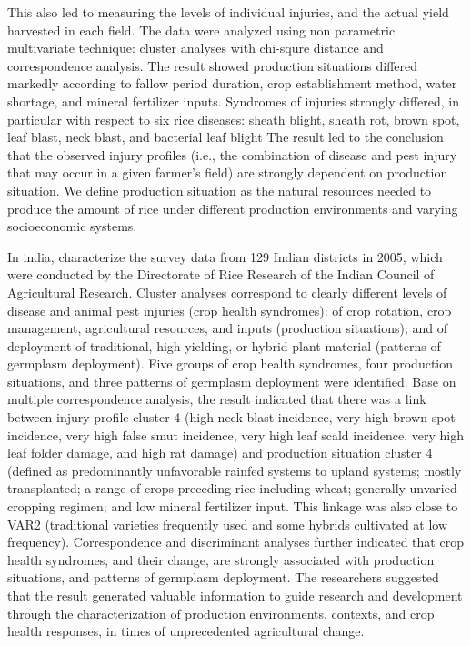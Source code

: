This also led to measuring the levels of individual injuries, and the actual yield harvested in each field. The data were analyzed using non parametric multivariate technique: cluster analyses with chi-squre distance and correspondence analysis. The result showed production situations differed markedly according to fallow period duration, crop establishment method, water shortage, and mineral fertilizer inputs. Syndromes of injuries strongly differed, in particular with respect to six rice diseases: sheath blight, sheath rot, brown spot, leaf blast, neck blast, and bacterial leaf blight The result led to the conclusion that the observed injury profiles (i.e., the combination of disease and pest injury that may occur in a given farmer’s field) are strongly dependent on production situation. We define production situation as the natural resources needed to produce the amount of rice under different production environments and varying socioeconomic systems.

In india, \cite{reddy2011characterizing} characterize the survey data from 129 Indian districts in 2005, which were conducted by the Directorate of Rice Research of the Indian Council of Agricultural Research. Cluster analyses correspond to clearly different levels of disease and animal pest injuries (crop health syndromes): of crop rotation, crop management, agricultural resources, and inputs (production situations); and of deployment of traditional, high yielding, or hybrid plant material (patterns of germplasm deployment). Five groups of crop health syndromes, four production situations, and three patterns of germplasm deployment were identified. Base on multiple correspondence analysis, the result indicated that there was a link between injury profile cluster 4 (high neck blast incidence, very high brown spot incidence, very high false smut incidence, very high leaf scald incidence, very high leaf folder damage, and high rat damage) and production situation cluster 4 (defined as predominantly unfavorable rainfed systems to upland systems; mostly transplanted; a range of crops preceding rice including wheat; generally unvaried cropping regimen; and low mineral fertilizer input. This linkage was also close to VAR2 (traditional varieties frequently used and some hybrids cultivated at low frequency). Correspondence and discriminant analyses further indicated that crop health syndromes, and their change, are strongly associated with production situations, and patterns of germplasm deployment. The researchers suggested that the result generated valuable information to guide research and development through the characterization of production environments, contexts, and crop health responses, in times of unprecedented agricultural change. 

